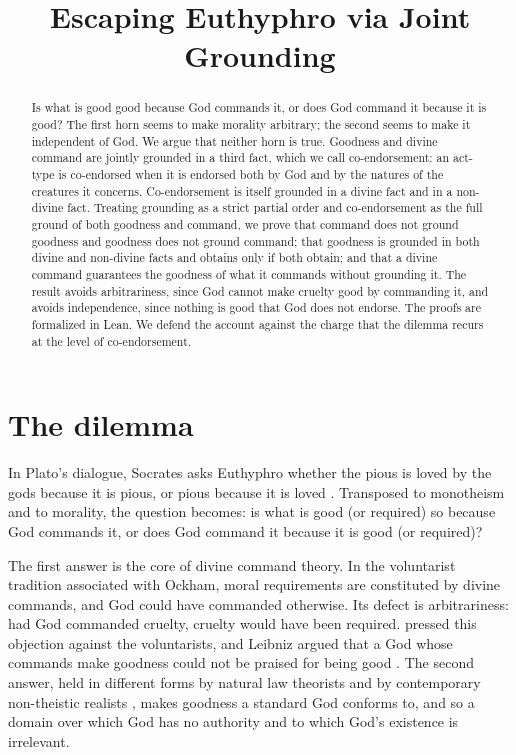 \documentclass{situationist-preprint}
\title{Escaping Euthyphro via Joint Grounding}
\begin{document}
\maketitle

\begin{abstract}
Is what is good good because God commands it, or does God command it because it is good? The first horn seems to make morality arbitrary; the second seems to make it independent of God. We argue that neither horn is true. Goodness and divine command are jointly grounded in a third fact, which we call co-endorsement: an act-type is co-endorsed when it is endorsed both by God and by the natures of the creatures it concerns. Co-endorsement is itself grounded in a divine fact and in a non-divine fact. Treating grounding as a strict partial order and co-endorsement as the full ground of both goodness and command, we prove that command does not ground goodness and goodness does not ground command; that goodness is grounded in both divine and non-divine facts and obtains only if both obtain; and that a divine command guarantees the goodness of what it commands without grounding it. The result avoids arbitrariness, since God cannot make cruelty good by commanding it, and avoids independence, since nothing is good that God does not endorse. The proofs are formalized in Lean. We defend the account against the charge that the dilemma recurs at the level of co-endorsement.
\end{abstract}

\section{The dilemma}

In Plato's dialogue, Socrates asks Euthyphro whether the pious is loved by the gods because it is pious, or pious because it is loved \citep[10a]{Euthyphro}. Transposed to monotheism and to morality, the question becomes: is what is good (or required) so because God commands it, or does God command it because it is good (or required)?

The first answer is the core of divine command theory. In the voluntarist tradition associated with Ockham, moral requirements are constituted by divine commands, and God could have commanded otherwise. Its defect is arbitrariness: had God commanded cruelty, cruelty would have been required. \citet{Cudworth1731} pressed this objection against the voluntarists, and Leibniz argued that a God whose commands make goodness could not be praised for being good \citep[\S2]{Leibniz1686}. The second answer, held in different forms by natural law theorists and by contemporary non-theistic realists \citep{Wielenberg2014}, makes goodness a standard God conforms to, and so a domain over which God has no authority and to which God's existence is irrelevant.
\end{document}
